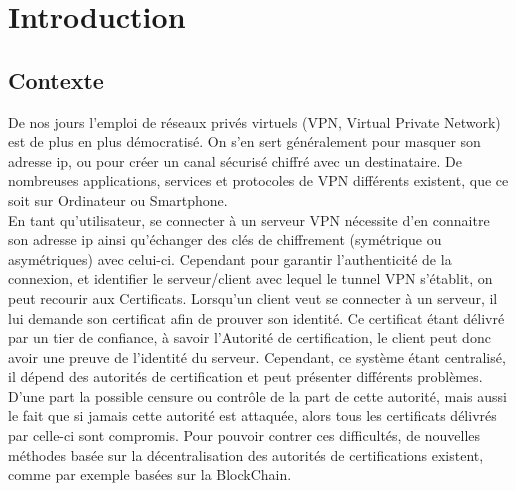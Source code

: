 \documentclass[12pt, openany]{report}
\begin{document}
\newpage

\renewcommand{\contentsname}{Sommaire}
\tableofcontents
\newpage

\section{Introduction}
\subsection{Contexte}
\noindent 
\begin{flushleft}
De nos jours l'emploi de réseaux privés virtuels (VPN, Virtual Private Network) est de plus en plus démocratisé. On s'en sert généralement pour masquer son adresse ip, ou pour créer un canal sécurisé chiffré avec un destinataire. De nombreuses applications, services et protocoles de VPN différents existent, que ce soit sur Ordinateur ou Smartphone.\\
En tant qu'utilisateur, se connecter à un serveur VPN nécessite d'en connaitre son adresse ip ainsi qu'échanger des clés de chiffrement (symétrique ou asymétriques) avec celui-ci. Cependant pour garantir l'authenticité de la connexion, et identifier le serveur/client avec lequel le tunnel VPN s'établit, on peut recourir aux Certificats. Lorsqu'un client veut se connecter à un serveur, il lui demande son certificat afin de prouver son identité. Ce certificat étant délivré par un tier de confiance, à savoir l'Autorité de certification, le client peut donc avoir une preuve de l'identité du serveur. Cependant, ce système étant centralisé, il dépend des autorités de certification et peut présenter différents problèmes. D'une part la possible censure ou contrôle de la part de cette autorité, mais aussi le fait que si jamais cette autorité est attaquée, alors tous les certificats délivrés par celle-ci sont compromis. Pour pouvoir contrer ces difficultés, de nouvelles méthodes basée sur la décentralisation des autorités de certifications existent, comme par exemple basées sur la BlockChain.\\
\end{flushleft}
\end{document}
